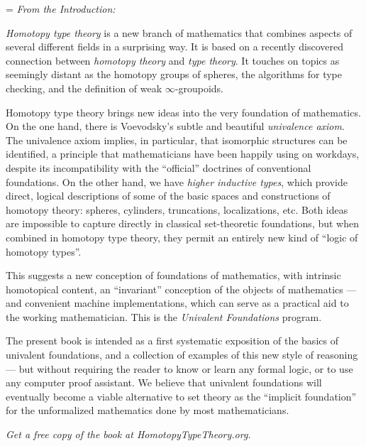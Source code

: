 
{\raggedright
\parindent=0pt
\parskip=\baselineskip
{\OPTbacktitlefont
\textit{From the Introduction:}}
\OPTbackfont

\emph{Homotopy type theory} is a new branch of mathematics that combines aspects of several different fields in a surprising way. It is based on a recently discovered connection between \emph{homotopy theory} and \emph{type theory}.
It touches on topics as seemingly distant as the homotopy groups of spheres, the algorithms for type checking, and the definition of weak $\infty$-groupoids.

Homotopy type theory brings new ideas into the very foundation of mathematics.
On the one hand, there is Voevodsky's subtle and beautiful \emph{univalence axiom}.
The univalence axiom implies, in particular, that isomorphic structures can be identified, a principle that mathematicians have been happily using on workdays, despite its incompatibility with the ``official'' doctrines of conventional foundations.
On the other hand, we have \emph{higher inductive types}, which provide direct, logical descriptions of some of the basic spaces and constructions of homotopy theory: spheres, cylinders, truncations, localizations, etc.
Both ideas are impossible to capture directly in classical set-theoretic foundations, but when combined in homotopy type theory, they permit an entirely new kind of ``logic of homotopy types''.

This suggests a new conception of foundations of mathematics, with intrinsic homotopical content, an ``invariant'' conception of the objects of mathematics --- and convenient machine implementations, which can serve as a practical aid to the working mathematician.
This is the \emph{Univalent Foundations} program.

The present book is intended as a first systematic exposition of the basics of univalent foundations, and a collection of examples of this new style of reasoning --- but without requiring the reader to know or learn any formal logic, or to use any computer proof assistant.
We believe that univalent foundations will eventually become a viable alternative to set theory as the ``implicit foundation'' for the unformalized mathematics done by most mathematicians.

\bigskip

\begin{center}
  {\Large
  \textit{Get a free copy of the book at HomotopyTypeTheory.org.}}
\end{center}
}
